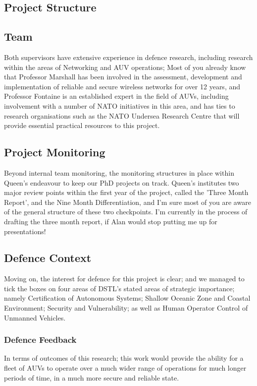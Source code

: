 \documentclass[oneside,11pt,a4paper]{Latex/Classes/PhDthesisPSnPDF}
\begin{document}
\begin{doublespace}
\section{Project Structure}  
\subsection{Team}
Both supervisors have extensive experience in defence
research, including research within the areas of Networking and AUV operations;
Most of you already know that Professor Marshall has been involved in the
assessment, development and implementation of reliable and secure wireless
networks for over 12 years, and Professor Fontaine is an established expert in
the field of AUVs, including involvement with a number of NATO initiatives in
this area, and has ties to research organisations such as the NATO Undersea
Research Centre that will provide essential practical resources to this project.

\subsection{Project Monitoring}  
Beyond internal team monitoring, the monitoring structures in
place within Queen's endeavour to keep our PhD projects on track. Queen's
institutes two major review points within the first year of the project, called the 'Three Month
Report', and the Nine Month Differentiation, and I'm sure most of you are aware
of the general structure of these two checkpoints. I'm currently in the process
of drafting the three month report, if Alan would stop putting me up for
presentations!

\subsection{Defence Context}  Moving on, the interest for defence for this
project is clear; and we managed to tick the boxes on four areas of
DSTL's stated areas of strategic importance; namely Certification of Autonomous
Systems; Shallow Oceanic Zone and Coastal Environment; Security and
Vulnerability; as well as Human Operator Control of Unmanned Vehicles.

\subsubsection{Defence Feedback}  In terms of outcomes of this research; this
work would provide the ability for a fleet of AUVs to operate over a much wider
range of operations for much longer periods of time, in a much more secure and
reliable state.


\end{doublespace}
\end{document}
